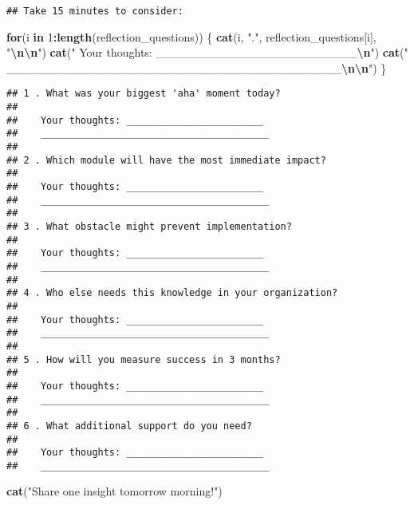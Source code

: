 \documentclass[
]{article}
\newenvironment{Shaded}{\begin{snugshade}}{\end{snugshade}}
\newcommand{\ControlFlowTok}[1]{\textcolor[rgb]{0.13,0.29,0.53}{\textbf{#1}}}
\newcommand{\DecValTok}[1]{\textcolor[rgb]{0.00,0.00,0.81}{#1}}
\newcommand{\FunctionTok}[1]{\textcolor[rgb]{0.13,0.29,0.53}{\textbf{#1}}}
\newcommand{\NormalTok}[1]{#1}
\newcommand{\SpecialCharTok}[1]{\textcolor[rgb]{0.81,0.36,0.00}{\textbf{#1}}}
\newcommand{\StringTok}[1]{\textcolor[rgb]{0.31,0.60,0.02}{#1}}
\begin{document}
\begin{verbatim}
## Take 15 minutes to consider:
\end{verbatim}

\begin{Shaded}
\begin{Highlighting}[]
\ControlFlowTok{for}\NormalTok{(i }\ControlFlowTok{in} \DecValTok{1}\SpecialCharTok{:}\FunctionTok{length}\NormalTok{(reflection\_questions)) \{}
  \FunctionTok{cat}\NormalTok{(i, }\StringTok{"."}\NormalTok{, reflection\_questions[i], }\StringTok{"}\SpecialCharTok{\textbackslash{}n\textbackslash{}n}\StringTok{"}\NormalTok{)}
  \FunctionTok{cat}\NormalTok{(}\StringTok{"   Your thoughts: \_\_\_\_\_\_\_\_\_\_\_\_\_\_\_\_\_\_\_\_\_\_\_\_}\SpecialCharTok{\textbackslash{}n}\StringTok{"}\NormalTok{)}
  \FunctionTok{cat}\NormalTok{(}\StringTok{"   \_\_\_\_\_\_\_\_\_\_\_\_\_\_\_\_\_\_\_\_\_\_\_\_\_\_\_\_\_\_\_\_\_\_\_\_\_\_\_\_}\SpecialCharTok{\textbackslash{}n\textbackslash{}n}\StringTok{"}\NormalTok{)}
\NormalTok{\}}
\end{Highlighting}
\end{Shaded}

\begin{verbatim}
## 1 . What was your biggest 'aha' moment today? 
## 
##    Your thoughts: ________________________
##    ________________________________________
## 
## 2 . Which module will have the most immediate impact? 
## 
##    Your thoughts: ________________________
##    ________________________________________
## 
## 3 . What obstacle might prevent implementation? 
## 
##    Your thoughts: ________________________
##    ________________________________________
## 
## 4 . Who else needs this knowledge in your organization? 
## 
##    Your thoughts: ________________________
##    ________________________________________
## 
## 5 . How will you measure success in 3 months? 
## 
##    Your thoughts: ________________________
##    ________________________________________
## 
## 6 . What additional support do you need? 
## 
##    Your thoughts: ________________________
##    ________________________________________
\end{verbatim}

\begin{Shaded}
\begin{Highlighting}[]
\FunctionTok{cat}\NormalTok{(}\StringTok{"Share one insight tomorrow morning!"}\NormalTok{)}
\end{Highlighting}
\end{Shaded}
\end{document}
